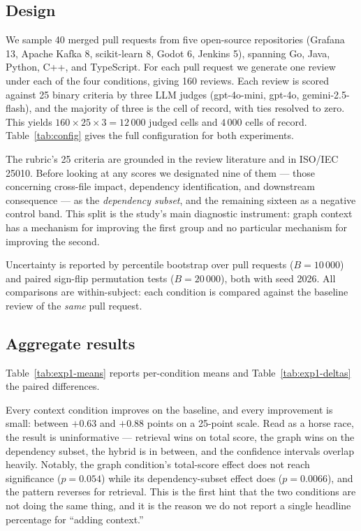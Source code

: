 \documentclass[conference]{IEEEtran}
\begin{document}
\subsection{Design}
We sample 40 merged pull requests from five open-source repositories
(Grafana 13, Apache Kafka 8, scikit-learn 8, Godot 6, Jenkins 5), spanning
Go, Java, Python, C++, and TypeScript. For each pull request we generate one
review under each of the four conditions, giving 160 reviews. Each review is
scored against 25 binary criteria by three LLM judges (gpt-4o-mini, gpt-4o,
gemini-2.5-flash), and the majority of three is the cell of record, with ties
resolved to zero. This yields $160 \times 25 \times 3 = 12\,000$ judged cells
and $4\,000$ cells of record. Table~\ref{tab:config} gives the full
configuration for both experiments.



The rubric's 25 criteria are grounded in the review literature
\cite{bacchelli2013, bosu2015, sadowski2018} and in ISO/IEC 25010.
Before looking at any scores we designated nine of them --- those concerning
cross-file impact, dependency identification, and downstream consequence ---
as the \emph{dependency subset}, and the remaining sixteen as a negative
control band. This split is the study's main diagnostic instrument: graph
context has a mechanism for improving the first group and no particular
mechanism for improving the second.

Uncertainty is reported by percentile bootstrap over pull requests
($B=10\,000$) and paired sign-flip permutation tests
($B=20\,000$), both with seed 2026. All comparisons are within-subject: each
condition is compared against the baseline review of the \emph{same} pull
request.

\subsection{Aggregate results}
Table~\ref{tab:exp1-means} reports per-condition means and
Table~\ref{tab:exp1-deltas} the paired differences.




Every context condition improves on the baseline, and every improvement is
small: between $+0.63$ and $+0.88$ points on a 25-point scale. Read as a
horse race, the result is uninformative --- retrieval wins on total score,
the graph wins on the dependency subset, the hybrid is in between, and the
confidence intervals overlap heavily. Notably, the graph condition's
total-score effect does not reach significance ($p = 0.054$) while its
dependency-subset effect does ($p = 0.0066$), and the pattern reverses for
retrieval. This is the first hint that the two conditions are not doing the
same thing, and it is the reason we do not report a single headline
percentage for ``adding context.''
\end{document}
